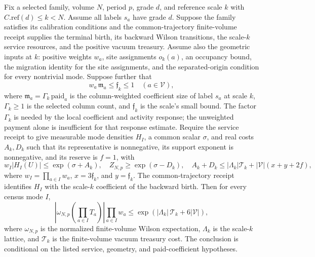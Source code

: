 \begin{theorem}\label{thm:ex-selected-birth-moment}
Fix a selected family, volume $N$, period $p$, grade $d$, and reference scale $k$ with $C.\mathrm{ref}(d)\leq k<N$. Assume all labels $s_a$ have grade $d$. Suppose the family satisfies its calibration conditions and the common-trajectory finite-volume receipt supplies the terminal birth, its backward Wilson transitions, the scale-$k$ service resources, and the positive vacuum treasury. Assume also the geometric inputs at $k$: positive weights $w_a$, site assignments $o_k(a)$, an occupancy bound, the migration identity for the site assignments, and the separated-origin condition for every nontrivial mode. Suppose further that
\[
 w_a\,\mathfrak m_a\leq \mathfrak f_k\leq1\quad(a\in\mathcal V),
\]
where $\mathfrak m_a=\Gamma_k\,\mathrm{paid}_a$ is the column-weighted coefficient size of label $s_a$ at scale $k$, $\Gamma_k\geq1$ is the selected column count, and $\mathfrak f_k$ is the scale's small bound. The factor $\Gamma_k$ is needed by the local coefficient and activity response; the unweighted payment alone is insufficient for that response estimate. Require the service receipt to give measurable mode densities $H_I$, a common scalar $\sigma$, and real costs $A_k,D_k$ such that its representative is nonnegative, its support exponent is nonnegative, and its reserve is $f=1$, with
\[
 w_I|H_I(U)|\leq \exp(\sigma+A_k),\quad
 Z_{N,p}\geq\exp(\sigma-D_k),\quad
 A_k+D_k\leq |\Lambda_k|\mathcal T_k+|\mathcal V|(x+y+2f),
\]
where $w_I=\prod_{a\in I}w_a$, $x=3\mathfrak f_k$, and $y=\mathfrak f_k$. The common-trajectory receipt identifies $H_I$ with the scale-$k$ coefficient of the backward birth. Then for every census mode $I$,
\begin{equation}
 \left|\omega_{N,p}\!\left(\prod_{a\in I}T_a\right)\right|
 \prod_{a\in I}w_a
 \leq \exp\!\left( |\Lambda_k|\,\mathcal T_k+6|\mathcal V|\right),
 \label{ex-selected-birth-bound}
\end{equation}
where $\omega_{N,p}$ is the normalized finite-volume Wilson expectation, $\Lambda_k$ is the scale-$k$ lattice, and $\mathcal T_k$ is the finite-volume vacuum treasury cost. The conclusion is conditional on the listed service, geometry, and paid-coefficient hypotheses.
\end{theorem}

